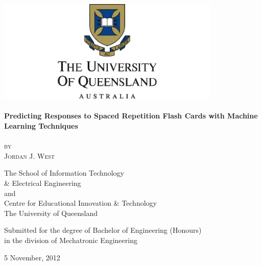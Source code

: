 \begin{titlepage}

\begin{center}

\vspace*{1.5cm}

\includegraphics[width=0.8\textwidth]{./uqlogo.jpg}\\[1cm]
    



\HRule \\[0.6cm]
{ \Large \bfseries Predicting Responses to Spaced Repetition Flash Cards with Machine Learning Techniques}\\[0.4cm]

\HRule \\[1.5cm]

\textsc{\large by}\\[0.5cm]
\textsc{\Large Jordan J. West}\\[0.5cm]

\vspace*{1cm}

The School of Information Technology \\
\& Electrical Engineering \\
\vspace*{0.2cm}
and \\
\vspace*{0.2cm}
Centre for Educational Innovation \& Technology \\
The University of Queensland
\vspace*{1cm}

Submitted for the degree of Bachelor of Engineering (Honours) \\
in the division of Mechatronic Engineering


\vfill

{\large 5 November, 2012}

\end{center}

\end{titlepage}
